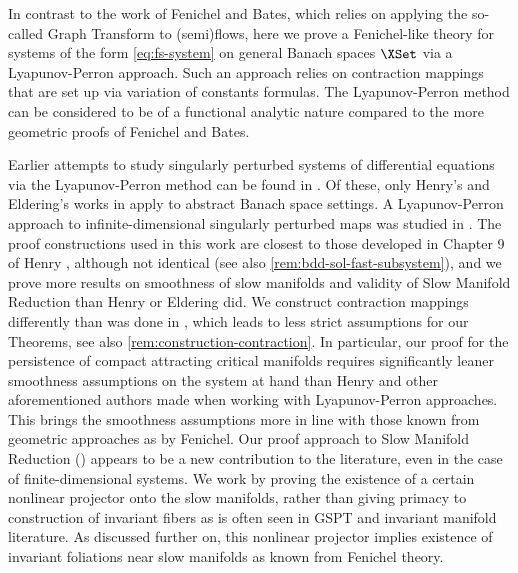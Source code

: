 \documentclass[a4paper]{siamart190516}
\begin{document}
In contrast to the work of Fenichel and Bates, which relies on applying the so-called
Graph Transform to (semi)flows, here we prove a Fenichel-like theory for systems of
the form \cref{eq:fs-system} on general Banach spaces $\XSet$ via a Lyapunov-Perron
approach. Such an approach relies on contraction mappings that are set up via
variation of constants formulas. The Lyapunov-Perron method can be considered to be
of a functional analytic nature compared to the more geometric proofs of Fenichel and Bates. 

Earlier attempts to study singularly perturbed systems of differential equations via the
Lyapunov-Perron method can be found in \cite{Za65, Ba68, He81, Sa90, El12}. Of these, 
only Henry's and Eldering's works in \cite{He81, El12} apply to abstract Banach space settings.
A Lyapunov-Perron approach to infinite-dimensional singularly perturbed maps was studied in \cite{Se13}.
The proof constructions used in this work are closest to those developed in Chapter 9 of Henry
\cite{He81}, although not identical (see also \cref{rem:bdd-sol-fast-subsystem}), and we prove
more results on smoothness of slow manifolds and validity of Slow Manifold Reduction than Henry
or Eldering did. We construct contraction mappings differently than was done in \cite{Sa90, El12},
which leads to less strict assumptions for our Theorems, see also \cref{rem:construction-contraction}.
In particular, our proof for the persistence of compact attracting critical manifolds requires significantly leaner
smoothness assumptions on the system at hand than Henry \cite{He81} and other aforementioned authors
made when working with Lyapunov-Perron approaches. This brings the smoothness assumptions more
in line with those known from geometric approaches as by Fenichel. Our proof approach to Slow Manifold Reduction
()
 appears to be a new contribution to the literature, even in the case of finite-dimensional systems. 
 We work by proving the existence of a certain nonlinear projector onto the slow manifolds, rather than giving
 primacy to construction of invariant fibers as is often seen in GSPT and invariant manifold literature. 
 As discussed further on, this nonlinear projector implies existence of invariant foliations near slow manifolds as known from Fenichel theory. 
\end{document}
